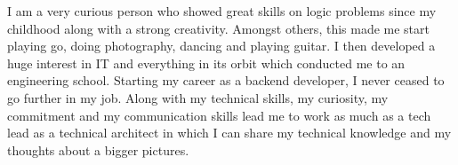 \documentclass[11pt,a4paper,ragged2e]{src/altacv_1column}
\begin{document}
\personalinfo{%
	\email{my@email}
  \phone{001 234 567}
  \location{Open to relocation}
  \age{>18 years old}
  
  
\mailaddress{in earth}
  \linkedin{linkedin.com/in/user}
  
}



\begin{fullwidth}
\makecvheader



\end{fullwidth}



I am a very curious person who showed great skills on logic problems since my childhood along with a strong creativity. Amongst others, this made me start playing go, doing photography, dancing and playing guitar. 
I then developed a huge interest in IT and everything in its orbit which conducted me to an engineering school.
Starting my career as a backend developer, I never ceased to go further in my job.
Along with my technical skills, my curiosity, my commitment and my communication skills lead me to work as much as a tech lead as a technical architect 
in which I can share my technical knowledge and my thoughts about a bigger pictures.



\setlength{\columnsep}{2cm}
\setlength{\columnseprule}{0.25mm}                          
\begin{multicols}{2}


\smallskip
\divider
\smallskip



\end{multicols}
\end{document}
